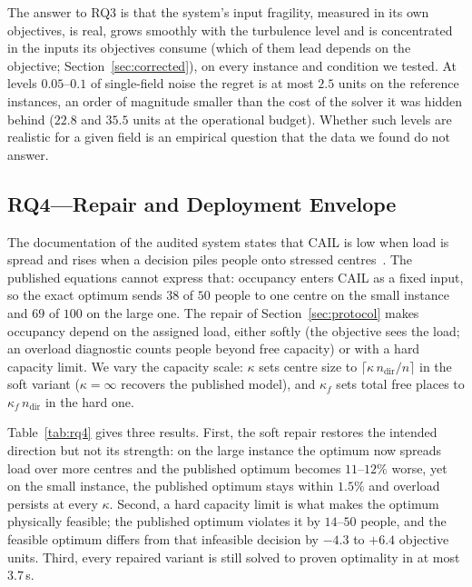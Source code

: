 \documentclass[systems,article,accept,moreauthors,pdftex]{Definitions/mdpi}
\begin{document}
The answer to RQ3 is that the system's input fragility, measured in its own objectives, is real,
grows smoothly with the turbulence level and is concentrated in the inputs its objectives consume
(which of them lead depends on the objective; Section~\ref{sec:corrected}),
on every instance and condition we tested. At levels $0.05$--$0.1$ of single-field noise the regret
is at most $2.5$ units on the reference instances, an order of magnitude smaller than the cost of
the solver it was hidden behind ($22.8$ and $35.5$ units at the operational budget). Whether such
levels are realistic for a given field is an empirical question that the data we found do not
answer.

\subsection{RQ4---Repair and Deployment Envelope}\label{sec:rq4}
The documentation of the audited system states that CAIL is low when load is spread and
rises when a decision piles people onto stressed centres~\cite{rabiei2026resilient}. The
published equations cannot express that: occupancy enters CAIL as a fixed input, so the
exact optimum sends $38$ of $50$ people to one centre on the small instance and $69$ of
$100$ on the large one. The repair of Section~\ref{sec:protocol} makes occupancy depend on
the assigned load, either softly (the objective sees the load; an overload diagnostic counts
people beyond free capacity) or with a hard capacity limit. We vary the capacity scale:
$\kappa$ sets centre size to $\lceil\kappa\, n_{\mathrm{dir}}/n\rceil$ in the soft variant
($\kappa = \infty$ recovers the published model), and $\kappa_f$ sets total free places to
$\kappa_f\, n_{\mathrm{dir}}$ in the \linebreak  hard one.

Table~\ref{tab:rq4} gives three results. First, the soft repair restores the intended
direction but not its strength: on the large instance the optimum now spreads load over more
centres and the published optimum becomes $11$--$12\%$ worse, yet on the small instance, the
published optimum stays within $1.5\%$ and overload persists at every $\kappa$. Second, a hard
capacity limit is what makes the optimum physically feasible; the published optimum violates it
by \linebreak  $14$--$50$ people, and the feasible optimum differs from that infeasible decision by $-4.3$ to
$+6.4$ objective units. Third, every repaired variant is still solved to proven optimality in at
most $3.7$\,s.
\end{document}
